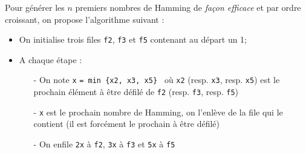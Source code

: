 \documentclass[11pt,a4paper]{article}
\begin{document}
\begin{Exercise}[title ={Nombres de Hamming}]
	Pour générer les $n$ premiers nombres de Hamming de \textit{façon efficace} et par ordre croissant, on propose l'algorithme suivant :

	\begin{itemize}
		\item On initialise trois files {\tt f2}, {\tt f3} et {\tt f5} contenant au départ un 1;
		\item A chaque étape :
		      \begin{itemize}
			      \item[-] On note {\tt x} {\tt = min \{x2, x3, x5\} } où {\tt x2} (resp. {\tt x3}, resp. {\tt x5}) est le prochain élément à être défilé de {\tt f2} (resp. {\tt f3}, resp. {\tt f5})
			      \item[-] {\tt x} est le prochain nombre de Hamming, on l'enlève de la file qui le contient (il est forcément le prochain à être défilé)
			      \item[-] On enfile {\tt 2x} à {\tt f2}, {\tt 3x} à {\tt f3} et {\tt 5x} à {\tt f5}
		      \end{itemize}
	\end{itemize}

	\leftskip 0pt


\end{Exercise}
\end{document}
